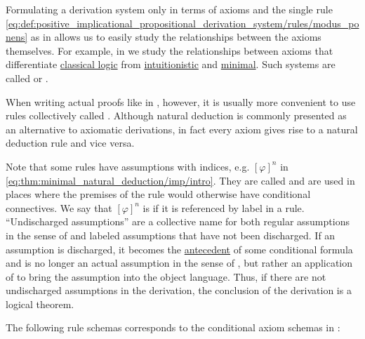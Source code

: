 \begin{proposition}\label{thm:minimal_natural_deduction}
  Formulating a derivation system only in terms of axioms and the single rule \eqref{eq:def:positive_implicational_propositional_derivation_system/rules/modus_ponens} as in  allows us to easily study the relationships between the axioms themselves. For example, in  we study the relationships between axioms that differentiate \hyperref[def:classical_logic]{classical logic} from \hyperref[def:intuitionistic_logic]{intuitionistic} and \hyperref[def:minimal_logic]{minimal}. Such systems are called  or .

  When writing actual proofs like in , however, it is usually more convenient to use rules collectively called . Although natural deduction is commonly presented as an alternative to axiomatic derivations, in fact every axiom gives rise to a natural deduction rule and vice versa.

  Note that some rules have assumptions with indices, e.g. \( [\varphi]^n \) in \eqref{eq:thm:minimal_natural_deduction/imp/intro}. They are called  and are used in places where the premises of the rule would otherwise have conditional connectives. We say that \( [\varphi]^n \) is  if it is referenced by label in a rule. \enquote{Undischarged assumptions} are a collective name for both regular assumptions in the sense of  and labeled assumptions that have not been discharged. If an assumption is discharged, it becomes the \hyperref[def:material_implication/antecedent]{antecedent} of some conditional formula and is no longer an actual assumption in the sense of , but rather an application of  to bring the assumption into the object language. Thus, if there are not undischarged assumptions in the derivation, the conclusion of the derivation is a logical theorem.

  \begin{thmenum}
     The following rule schemas corresponds to the conditional axiom schemas in :


\end{thmenum}
\end{proposition}
